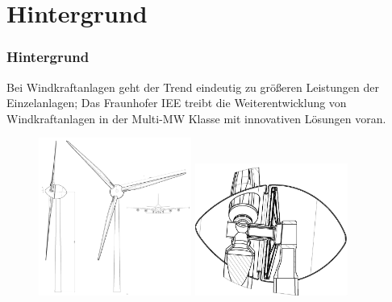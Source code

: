 \documentclass[serif,11pt, xcolor=table]{beamer}
\begin{document}
\section{Hintergrund}
\begin{frame}
		\frametitle{Hintergrund}
\tiny{Bei Windkraftanlagen geht der Trend eindeutig zu größeren Leistungen der Einzelanlagen; Das Fraunhofer IEE treibt die Weiterentwicklung von Windkraftanlagen in der Multi-MW Klasse mit innovativen Lösungen voran.}
			\begin{figure}[htbp]
			\centering
			\begin{minipage}[t]{0.48\textwidth}
				\centering
				\includegraphics[width=5cm]{Abbildungen/PMSG.PNG}
				
			\end{minipage}
			\begin{minipage}[t]{0.48\textwidth}
				\centering
				\includegraphics[width=5cm]{Abbildungen/Windkraftanlage.png}
				
			\end{minipage}
		\end{figure}	
		
	\end{frame}
\end{document}
